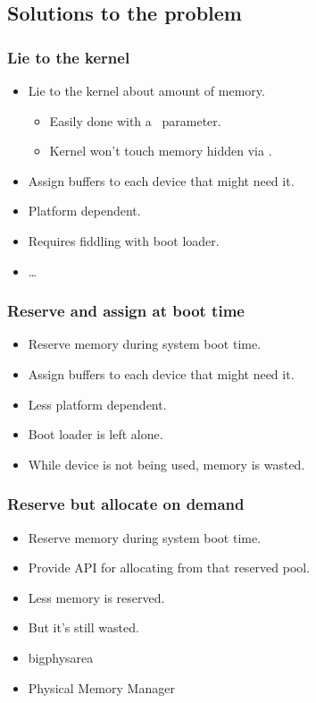 \subsection{Solutions to the problem}

\begin{frame}
  \frametitle{Lie to the kernel}

  \begin{itemize}
  \item Lie to the kernel about amount of memory.
    \begin{itemize}
    \item Easily done with a~ parameter.
    \item Kernel won't touch memory hidden via .
    \end{itemize}
  \item Assign buffers to each device that might need it.
  \item Platform dependent.
  \item Requires fiddling with boot loader.
  \item \ldots
  \end{itemize}
\end{frame}

\begin{frame}
  \frametitle{Reserve and assign at boot time}

  \begin{itemize}
  \item Reserve memory during system boot time.
  \item Assign buffers to each device that might need it.
  \item Less platform dependent.
  \item Boot loader is left alone.
  \item While device is not being used, memory is wasted.
  \end{itemize}
\end{frame}

\begin{frame}
  \frametitle{Reserve but allocate on demand}

  \begin{itemize}
  \item Reserve memory during system boot time.
  \item Provide API for allocating from that reserved pool.
  \item Less memory is reserved.
  \item But it's still wasted.
  \end{itemize}

  \begin{itemize}
  \item bigphysarea
  \item Physical Memory Manager
  \end{itemize}
\end{frame}

